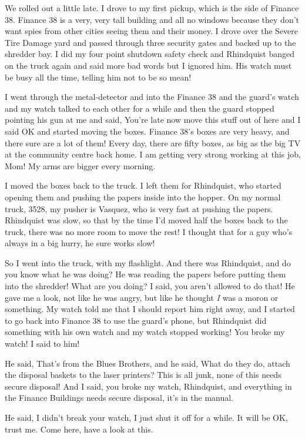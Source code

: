 We rolled out a little late. I drove to my first pickup, which is the 
side of Finance 38. Finance 38 is a very, very tall building and all no 
windows because they don't want spies from other cities seeing them and 
their money. I drove over the Severe Tire Damage yard and passed 
through three security gates and backed up to the shredder bay. I did 
my four point shutdown safety check and Rhindquist banged on the truck 
again and said more bad words but I ignored him. His watch must be busy 
all the time, telling him not to be so mean!

I went through the metal-detector and into the Finance 38 and the 
guard's watch and my watch talked to each other for a while and then 
the guard stopped pointing his gun at me and said, You're late now move 
this stuff out of here and I said OK and started moving the boxes. 
Finance 38's boxes are very heavy, and there sure are a lot of them! 
Every day, there are fifty boxes, as big as the big TV at the community 
centre back home. I am getting very strong working at this job, Mom! My 
arms are bigger every morning.

I moved the boxes back to the truck. I left them for Rhindquist, who 
started opening them and pushing the papers inside into the hopper. On 
my normal truck, 3528, my pusher is Vasquez, who is very fast at 
pushing the papers. Rhindquist was slow, so that by the time I'd moved 
half the boxes back to the truck, there was no more room to move the 
rest! I thought that for a guy who's always in a big hurry, he sure 
works slow!

So I went into the truck, with my flashlight. And there was Rhindquist, 
and do you know what he was doing? He was reading the papers before 
putting them into the shredder! What are you doing? I said, you aren't 
allowed to do that! He gave me a look, not like he was angry, but like 
he thought \emph{I} was a moron or something. My watch told me that I 
should report him right away, and I started to go back into Finance 38 
to use the guard's phone, but Rhindquist did something with his own 
watch and my watch stopped working! You broke my watch! I said to him!

He said, That's from the Blues Brothers, and he said, What do they do, 
attach the disposal baskets to the laser printers? This is all junk, 
none of this needs secure disposal! And I said, you broke my watch, 
Rhindquist, and everything in the Finance Buildings needs secure 
disposal, it's in the manual.

He said, I didn't break your watch, I just shut it off for a while. It 
will be OK, trust me. Come here, have a look at this.

